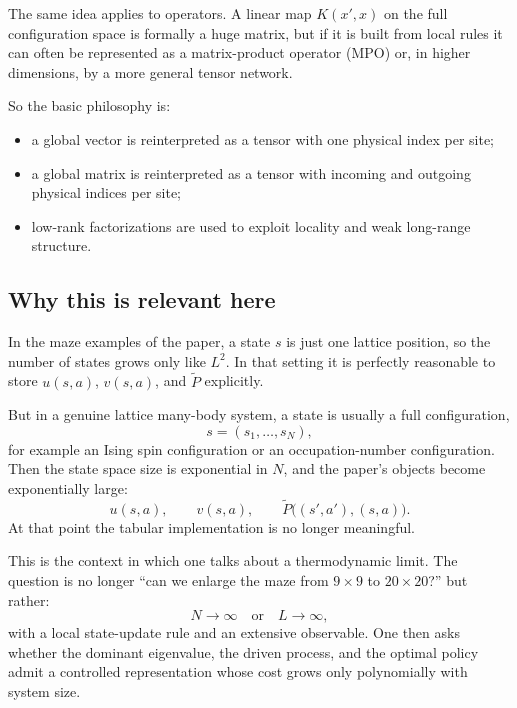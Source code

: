 \documentclass[11pt]{article}
\begin{document}
The same idea applies to operators. A linear map \(K(x',x)\) on the full configuration space
is formally a huge matrix, but if it is built from local rules it can often be represented as a
matrix-product operator (MPO) or, in higher dimensions, by a more general tensor network.

So the basic philosophy is:
\begin{itemize}
    \item a global vector is reinterpreted as a tensor with one physical index per site;
    \item a global matrix is reinterpreted as a tensor with incoming and outgoing physical
    indices per site;
    \item low-rank factorizations are used to exploit locality and weak long-range structure.
\end{itemize}

\subsection*{Why this is relevant here}

In the maze examples of the paper, a state \(s\) is just one lattice position, so the number of
states grows only like \(L^2\). In that setting it is perfectly reasonable to store
\(u(s,a)\), \(v(s,a)\), and \(\widetilde P\) explicitly.

But in a genuine lattice many-body system, a state is usually a full configuration,
\begin{equation}
    s=(s_1,\dots,s_N),
\end{equation}
for example an Ising spin configuration or an occupation-number configuration. Then the state
space size is exponential in \(N\), and the paper's objects become exponentially large:
\begin{equation}
    u(s,a),\qquad v(s,a),\qquad \widetilde P\big((s',a'),(s,a)\big).
\end{equation}
At that point the tabular implementation is no longer meaningful.

This is the context in which one talks about a thermodynamic limit. The question is no longer
``can we enlarge the maze from \(9\times 9\) to \(20\times 20\)?'' but rather:
\begin{equation}
    N\to\infty \quad \text{or} \quad L\to\infty,
\end{equation}
with a local state-update rule and an extensive observable. One then asks whether the dominant
eigenvalue, the driven process, and the optimal policy admit a controlled representation whose
cost grows only polynomially with system size.
\end{document}
